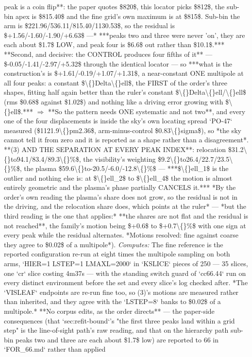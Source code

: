 \begin{description}
peak is a coin flip**: the paper quotes \$820\$, this locator picks \$812\$, the sub-bin apex is \$815.40\$ and the fine grid's own maximum is at \$815\$. Sub-bin the arm is \$221.96/536.11/815.40/1130.53\$, so the residual is \$+1.56/-1.60/-1.90/+6.63\$ ---* ***peaks two and three were never 'on', they are each about \$1.7\$ LOW, and peak four is \$6.6\$ out rather than \$10.1\$.*** **Second, and decisive: the CONTROL produces four fifths of it** --- \$-0.05/-1.41/-2.97/+5.32\$ through the identical locator --- so ***what is the construction's is \$+1.61/-0.19/+1.07/+1.31\$, a near-constant ONE multipole at all four peaks: a constant \$\textbackslash\{\}Delta\textbackslash\{\}ell\$, the FIRST of the order's three shapes, fitting half again better than the ruler's constant \$\textbackslash\{\}Delta\textbackslash\{\}ell/\textbackslash\{\}ell\$ (rms \$0.68\$ against \$1.02\$) and nothing like a driving error growing with \$\textbackslash\{\}ell\$.*** \ensuremath{\Rightarrow} **So the pattern needs ONE systematic and not two**, and every one of the four displacements is inside the sky's own locating spread `PO-47` measured (\$1121.9\textbackslash\{\}pm2.36\$, arm-minus-control \$0.83\textbackslash\{\}sigma\$), so *the sky cannot tell it from zero and it is reported as a shape rather than a disagreement*.  **(3) AND THE SEPARATION AT EVERY PEAK INDEX**: relocation \$31.2\textbackslash\{\}to94.1/83.4/89.3\textbackslash\{\}\%\$, the visibility's weighting \$9.2\textbackslash\{\}to26.4/22.7/23.5\textbackslash\{\}\%\$, the plasma \$59.6\textbackslash\{\}to-20.5/-6.0/-12.8\textbackslash\{\}\%\$ --- ***\$\textbackslash\{\}ell\_1\$ is the outlier and nothing else is: at \$\textbackslash\{\}ell\_2\$ to \$\textbackslash\{\}ell\_4\$ the motion is almost entirely geometric and the plasma's phase partially CANCELS it.*** *By the order's own reading the plasma's share does not grow, so the residual is not in the driving, and the relocation share does, which points at the ruler* ---  *but the third reading is the one that applies:* **the shares are not flat and the residual is not reached**, the family's motion being \$+0.6\$ to \$+0.7\textbackslash\{\}\%\$ with one sign at every peak while the residual alternates. *Motions resolved: fine against coarse they agree to \$0.02\$ of a multipole*). 
\emph{Computes:} The fine reference is the reported configuration re-run at eight times the multipole sampling on both arms, `HIER=1 LSTEP=1 LMAXL=2000` in `KSLICE` pieces of 250 --- 35 slices, one `cr` slice costing 4m37s --- with the standing switch guard of `cc66.44` run on every distinct environment before the set and every slice's log checked after. *The `VISLEAF` endpoints are re-run fine too, so (3)'s motions are measured rather than inherited, and they agree with the `LSTEP=8` banks to \$0.02\$ of a multipole.*  **No corpus edits, as the order directs** --- the paper-side consequences (that `sec:refit-bound`'s "the first three peaks land within a grid step" is the line-of-sight path's raw reading, and that on the hierarchy path sub-bin peaks two and three are each about \$1.7\$ low) are reported to 66 in `FOR\_66.md` rather than applied

\end{description}
